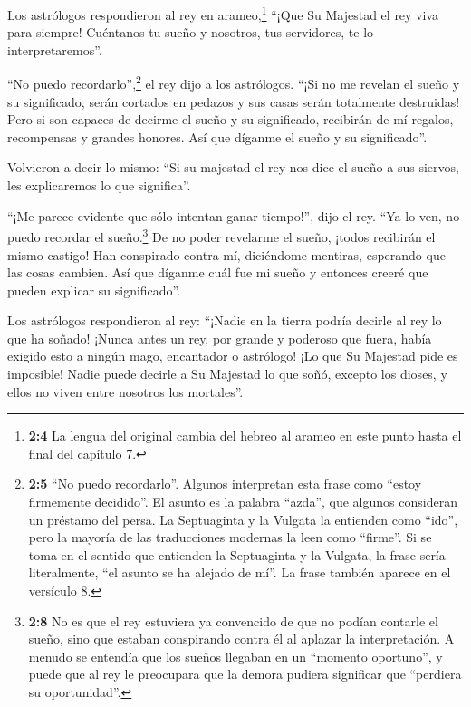  Los astrólogos respondieron al rey en arameo,\footnote{\textbf{2:4}
  La lengua del original cambia del hebreo al arameo en este punto hasta
  el final del capítulo 7.} ``¡Que Su Majestad el rey viva para siempre!
Cuéntanos tu sueño y nosotros, tus servidores, te lo interpretaremos''.

 ``No puedo recordarlo'',\footnote{\textbf{2:5} ``No puedo
  recordarlo''. Algunos interpretan esta frase como ``estoy firmemente
  decidido''. El asunto es la palabra ``azda'', que algunos consideran
  un préstamo del persa. La Septuaginta y la Vulgata la entienden como
  ``ido'', pero la mayoría de las traducciones modernas la leen como
  ``firme''. Si se toma en el sentido que entienden la Septuaginta y la
  Vulgata, la frase sería literalmente, ``el asunto se ha alejado de
  mí''. La frase también aparece en el versículo 8.} el rey dijo a los
astrólogos. ``¡Si no me revelan el sueño y su significado, serán
cortados en pedazos y sus casas serán totalmente destruidas!
 Pero si son capaces de decirme el sueño y su significado,
recibirán de mí regalos, recompensas y grandes honores. Así que díganme
el sueño y su significado''.

 Volvieron a decir lo mismo: ``Si su majestad el rey nos
dice el sueño a sus siervos, les explicaremos lo que significa''.

 ``¡Me parece evidente que sólo intentan ganar tiempo!'',
dijo el rey. ``Ya lo ven, no puedo recordar el sueño.\footnote{\textbf{2:8}
  No es que el rey estuviera ya convencido de que no podían contarle el
  sueño, sino que estaban conspirando contra él al aplazar la
  interpretación. A menudo se entendía que los sueños llegaban en un
  ``momento oportuno'', y puede que al rey le preocupara que la demora
  pudiera significar que ``perdiera su oportunidad''.}  De
no poder revelarme el sueño, ¡todos recibirán el mismo castigo! Han
conspirado contra mí, diciéndome mentiras, esperando que las cosas
cambien. Así que díganme cuál fue mi sueño y entonces creeré que pueden
explicar su significado''.

 Los astrólogos respondieron al rey: ``¡Nadie en la
tierra podría decirle al rey lo que ha soñado! ¡Nunca antes un rey, por
grande y poderoso que fuera, había exigido esto a ningún mago,
encantador o astrólogo!  ¡Lo que Su Majestad pide es
imposible! Nadie puede decirle a Su Majestad lo que soñó, excepto los
dioses, y ellos no viven entre nosotros los mortales''.

